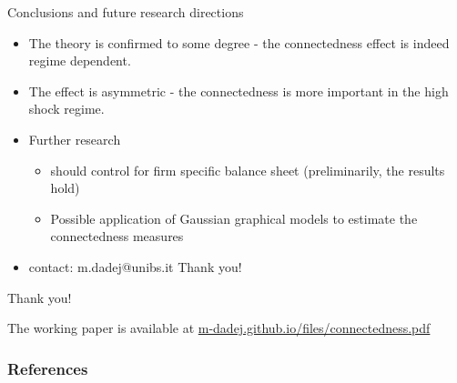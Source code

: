 \documentclass{beamer}
\begin{document}
\begin{frame}{Conclusions and future research directions}
\begin{itemize}
  \item<1-> The theory is confirmed to some degree - the connectedness effect is indeed regime dependent.
  \item<2-> The effect is asymmetric - the connectedness is more important in the high shock regime.
  \item<3-> Further research 
  \begin{itemize}
    \item<4-> should control for firm specific balance sheet (preliminarily, the results hold)
    \item<5-> Possible application of Gaussian graphical models to estimate the connectedness measures
  \end{itemize}
  \item<6-> contact: m.dadej@unibs.it Thank you!
\end{itemize}
\end{frame}

\begin{frame}
	Thank you!
	
	The working paper is available at \url{m-dadej.github.io/files/connectedness.pdf}
\end{frame}


\begin{frame}[allowframebreaks]
\frametitle{References}
  \printbibliography
\end{frame}
\end{document}
